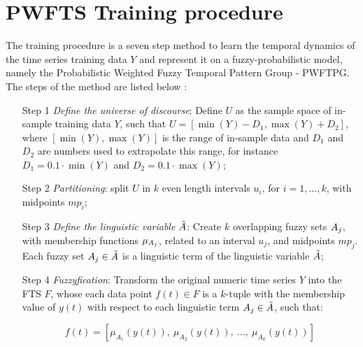 \section{PWFTS Training procedure}
\label{sec:pwfts_training}

The training procedure is a seven step method to learn the temporal dynamics of the time series training data $Y$ and represent it on a fuzzy-probabilistic model, namely the Probabilistic Weighted Fuzzy Temporal Pattern Group - PWFTPG. The steps of the method are listed below :

\begin{enumerate}
\item[Step 1] \textit{Define the universe of discourse}: Define $U$ as the sample space of in-sample training data $Y$, such that $U = [\min(Y) - D_1, \max(Y)+D_2]$, where $[\min(Y), \max(Y)]$ is the range of in-sample data and $D_1$ and $D_2$ are numbers used to extrapolate this range, for instance $D_1 = 0.1\cdot\min(Y)$ and $D_2 = 0.1\cdot\max(Y)$;

\item[Step 2] \textit{Partitioning}: split $U$ in $k$ even length intervals $u_i$, for $i = 1,\ldots,k$, with midpoints $mp_i$;

\item[Step 3] \textit{Define the linguistic variable $\tilde{A}$}: Create $k$ overlapping fuzzy sets $A_j$, with membership functions $\mu_{A_j}$, related to an interval $u_j$, and midpoints $mp_j$. Each fuzzy set $A_j \in \tilde{A}$ is a linguistic term of the linguistic variable $\tilde{A}$;

\item[Step 4] \textit{Fuzzyfication}: Transform the original numeric time series $Y$ into the FTS $F$, whose each data point $f(t) \in F$ is a $k$-tuple with the membership value of $y(t)$ with respect to each linguistic term $A_j \in \tilde{A}$, such that:

\begin{equation}
f(t) = \left[\mu_{A_1}(y(t)),\ \mu_{A_2}(y(t)),\ \ldots,\ \mu_{A_k}(y(t)) \right]
\end{equation}


\end{enumerate}
